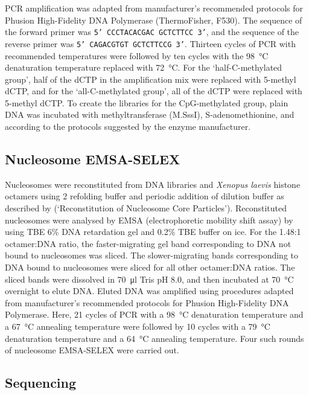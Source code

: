 \documentclass[a4paper, numbers=noenddot]{scrbook}
\begin{document}
PCR amplification was adapted from manufacturer's recommended protocols for Phusion High-Fidelity DNA Polymerase (ThermoFisher, F530).  The sequence of the forward primer was \texttt{5' CCCTACACGAC GCTCTTCC 3'}, and the sequence of the reverse primer was \texttt{5' CAGACGTGT GCTCTTCCG 3'}.  Thirteen cycles of PCR with recommended temperatures were followed by ten cycles with the \SI{98}{\celsius} denaturation temperature replaced with \SI{72}{\celsius}.  For the `half-C-methylated group', half of the dCTP in the amplification mix were replaced with 5-methyl dCTP, and for the `all-C-methylated group', all of the dCTP were replaced with 5-methyl dCTP.  To create the libraries for the CpG-methylated group, plain DNA was incubated with methyltransferase (M.SssI), S-adenomethionine, and  according to the protocols suggested by the enzyme manufacturer.

\subsection{Nucleosome EMSA-SELEX}
\label{ssec:emsaselex_methods_selex}

Nucleosomes were reconstituted from DNA libraries and \emph{Xenopus laevis} histone octamers using \SI{2}{\Molar}  refolding buffer and periodic addition of dilution buffer as described by \citet{dyer_reconstitution_2003} (`Reconstitution of Nucleosome Core Particles').  Reconstituted nucleosomes were analysed by EMSA (electrophoretic mobility shift assay) by using TBE 6\% DNA retardation gel and 0.2\% TBE buffer on ice.  For the 1.48:1 octamer:DNA ratio, the faster-migrating gel band corresponding to DNA not bound to nucleosomes was sliced.  The slower-migrating bands corresponding to DNA bound to nucleosomes were sliced for all other octamer:DNA ratios.  The sliced bands were dissolved in \SI{70}{\micro\litre} Tris pH 8.0, and then incubated at \SI{70}{\celsius} overnight to elute DNA.  Eluted DNA was amplified using procedures adapted from manufacturer's recommended protocols for Phusion High-Fidelity DNA Polymerase.  Here, 21 cycles of PCR with a \SI{98}{\celsius} denaturation temperature and a \SI{67}{\celsius} annealing temperature were followed by 10 cycles with a \SI{79}{\celsius} denaturation temperature and a \SI{64}{\celsius} annealing temperature.  Four such rounds of nucleosome EMSA-SELEX were carried out.

\subsection{Sequencing}
\label{ssec:emsaselex_methods_seq}
\end{document}
